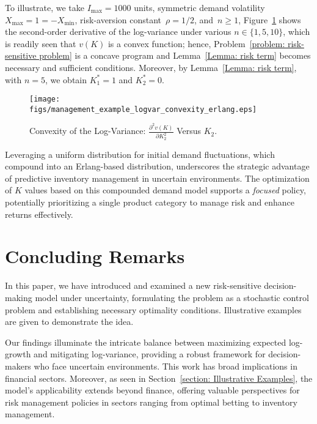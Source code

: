 To illustrate, we take $I_{\max} = 1000$ units, symmetric demand volatility $X_{\max} = 1 = -X_{\min}$, risk-aversion constant~$\rho = 1/2$, and~$n \geq 1 $,
Figure~\ref{fig: Convexity of the Log-Variance} shows the second-order derivative of the log-variance under various $n \in \{1, 5, 10\}$, which is readily seen that $v(K)$ is a convex function; hence, Problem~\eqref{problem: risk-sensitive problem} is a concave program and Lemma~\ref{Lemma: risk term} becomes necessary and sufficient conditions. Moreover, by Lemma~\ref{Lemma: risk term}, with $n=5$, we obtain $K_1^*=1$ and $K_2^*=0$.


\begin{figure}[h!]
    \centering
    \texttt{[image: figs/management\_example\_logvar\_convexity\_erlang.eps]}
    \caption{Convexity of the Log-Variance: $\frac{\partial^2 v(K)}{\partial K_2^2}$ Versus $K_2$.}
    \label{fig: Convexity of the Log-Variance}
\end{figure}


\begin{remark} \rm
    Leveraging a uniform distribution for initial demand fluctuations, which compound into an Erlang-based distribution, underscores the strategic advantage of predictive inventory management in uncertain environments. The optimization of \(K\) values based on this compounded demand model supports a {\em focused} policy, potentially prioritizing a single product category to manage risk and enhance returns effectively. 
\end{remark}
    
 


\section{Concluding Remarks} \label{section: Concluding Remarks}
    In this paper, we have introduced and examined a new risk-sensitive decision-making model under uncertainty, formulating the problem as a stochastic control problem and establishing necessary optimality conditions.
    Illustrative examples are given to demonstrate the idea.

    Our findings illuminate the intricate balance between maximizing expected log-growth and mitigating log-variance, providing a robust framework for decision-makers who face uncertain environments. This work has broad implications in financial sectors. Moreover, as seen in Section~\ref{section: Illustrative Examples}, the model's applicability extends beyond finance, offering valuable perspectives for risk management policies in sectors ranging from optimal betting to inventory management.

